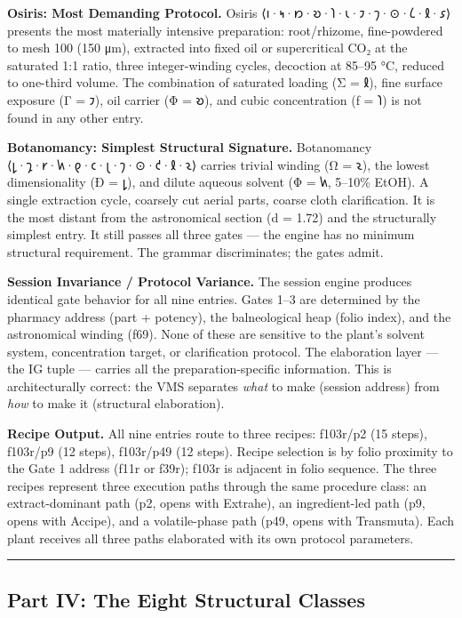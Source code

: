 \textbf{Osiris: Most Demanding Protocol.} Osiris
⟨𐑦·𐑰·𐑽·𐑹·𐑐·𐑧·𐑲·𐑠·⊙·𐑖·𐑙·𐑭⟩ presents the most materially intensive
preparation: root/rhizome, fine-powdered to mesh 100 (150 μm), extracted
into fixed oil or supercritical CO₂ at the saturated 1:1 ratio, three
integer-winding cycles, decoction at 85--95 °C, reduced to one-third
volume. The combination of saturated loading (Σ = 𐑙), fine surface
exposure (Γ = 𐑲), oil carrier (Φ = 𐑹), and cubic concentration (ƒ = 𐑐)
is not found in any other entry.

\textbf{Botanomancy: Simplest Structural Signature.} Botanomancy
⟨𐑛·𐑡·𐑾·𐑿·𐑞·𐑤·𐑚·𐑠·⊙·𐑒·𐑙·𐑷⟩ carries trivial winding (Ω = 𐑷), the lowest
dimensionality (Ð = 𐑛), and dilute aqueous solvent (Φ = 𐑿, 5--10\%
EtOH). A single extraction cycle, coarsely cut aerial parts, coarse
cloth clarification. It is the most distant from the astronomical
section (d = 1.72) and the structurally simplest entry. It still passes
all three gates --- the engine has no minimum structural requirement.
The grammar discriminates; the gates admit.

\textbf{Session Invariance / Protocol Variance.} The session engine
produces identical gate behavior for all nine entries. Gates 1--3 are
determined by the pharmacy address (part + potency), the balneological
heap (folio index), and the astronomical winding (f69). None of these
are sensitive to the plant's solvent system, concentration target, or
clarification protocol. The elaboration layer --- the IG tuple ---
carries all the preparation-specific information. This is
architecturally correct: the VMS separates \emph{what} to make (session
address) from \emph{how} to make it (structural elaboration).

\textbf{Recipe Output.} All nine entries route to three recipes:
f103r/p2 (15 steps), f103r/p9 (12 steps), f103r/p49 (12 steps). Recipe
selection is by folio proximity to the Gate 1 address (f11r or f39r);
f103r is adjacent in folio sequence. The three recipes represent three
execution paths through the same procedure class: an extract-dominant
path (p2, opens with Extrahe), an ingredient-led path (p9, opens with
Accipe), and a volatile-phase path (p49, opens with Transmuta). Each
plant receives all three paths elaborated with its own protocol
parameters.

\begin{center}\rule{0.5\linewidth}{0.5pt}\end{center}

\hypertarget{part-iv-the-eight-structural-classes}{%
\subsection{Part IV: The Eight Structural
Classes}\label{part-iv-the-eight-structural-classes}}

